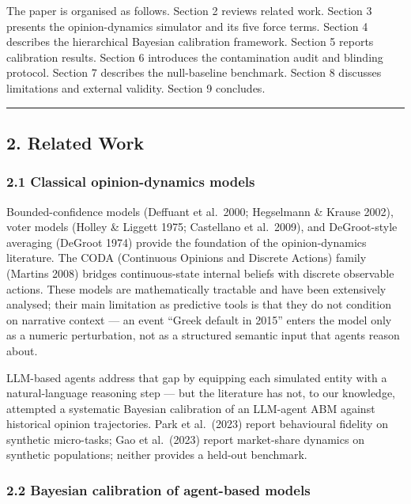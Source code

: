 \documentclass[
]{article}
\begin{document}
The paper is organised as follows. Section 2 reviews related work.
Section 3 presents the opinion-dynamics simulator and its five force
terms. Section 4 describes the hierarchical Bayesian calibration
framework. Section 5 reports calibration results. Section 6 introduces
the contamination audit and blinding protocol. Section 7 describes the
null-baseline benchmark. Section 8 discusses limitations and external
validity. Section 9 concludes.

\begin{center}\rule{0.5\linewidth}{0.5pt}\end{center}

\subsection{2. Related Work}\label{related-work}

\subsubsection{2.1 Classical opinion-dynamics
models}\label{classical-opinion-dynamics-models}

Bounded-confidence models (Deffuant et al.~2000; Hegselmann \& Krause
2002), voter models (Holley \& Liggett 1975; Castellano et al.~2009),
and DeGroot-style averaging (DeGroot 1974) provide the foundation of the
opinion-dynamics literature. The CODA (Continuous Opinions and Discrete
Actions) family (Martins 2008) bridges continuous-state internal beliefs
with discrete observable actions. These models are mathematically
tractable and have been extensively analysed; their main limitation as
predictive tools is that they do not condition on narrative context ---
an event ``Greek default in 2015'' enters the model only as a numeric
perturbation, not as a structured semantic input that agents reason
about.

LLM-based agents address that gap by equipping each simulated entity
with a natural-language reasoning step --- but the literature has not,
to our knowledge, attempted a systematic Bayesian calibration of an
LLM-agent ABM against historical opinion trajectories. Park et
al.~(2023) report behavioural fidelity on synthetic micro-tasks; Gao et
al.~(2023) report market-share dynamics on synthetic populations;
neither provides a held-out benchmark.

\subsubsection{2.2 Bayesian calibration of agent-based
models}\label{bayesian-calibration-of-agent-based-models}
\end{document}

